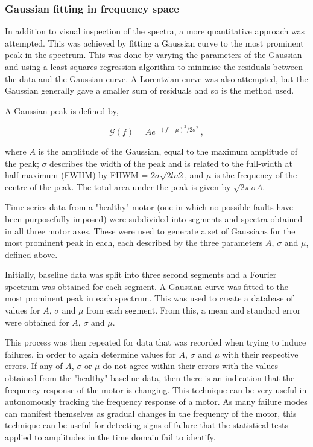 \subsubsection{Gaussian fitting in frequency space}

In addition to visual inspection of the spectra, a more quantitative approach was attempted. This was achieved by fitting a Gaussian curve to the most prominent peak in the spectrum. This was done by varying the parameters of the Gaussian and using a least-squares regression algorithm to minimise the residuals between the data and the Gaussian curve. A Lorentzian curve was also attempted, but the Gaussian generally gave a smaller sum of residuals and so is the method used. 

A Gaussian peak is defined by,

\begin{equation}
   \mathcal{G}(f) = A e^{-(f-\mu)^2/2\sigma^2}~,
    \label{eq:gaussian}
\end{equation}

where $A$ is the amplitude of the Gaussian, equal to the maximum amplitude of the peak; $\sigma$ describes the width of the peak and is related to the full-width at half-maximum (FWHM) by FHWM = $2\sigma \sqrt{2ln2}$, and $\mu$ is the frequency of the centre of the peak. The total area under the peak is given by $\sqrt{2\pi}\sigma A$.

Time series data from a "healthy" motor (one in which no possible faults have been purposefully imposed) were subdivided into segments and spectra obtained in all three motor axes. These were used to generate a set of Gaussians for the most prominent peak in each, each described by the three parameters $A$, $\sigma$ and $\mu$, defined above.

Initially, baseline data was split into three second segments and a Fourier spectrum was obtained for each segment. A Gaussian curve was fitted to the most prominent peak in each spectrum. This was used to create a database of values for $A$, $\sigma$ and $\mu$ from each segment. From this, a mean and standard error were obtained for $A$, $\sigma$ and $\mu$. 

This process was then repeated for data that was recorded when trying to induce failures, in order to again determine values for $A$, $\sigma$ and $\mu$ with their respective errors. If any of $A$, $\sigma$ or $\mu$ do not agree within their errors with the values obtained from the "healthy" baseline data, then there is an indication that the frequency response of the motor is changing. This technique can be very useful in autonomously tracking the frequency response of a motor. As many failure modes can manifest themselves as gradual changes in the frequency of the motor, this technique can be useful for detecting signs of failure that the statistical tests applied to amplitudes in the time domain fail to identify.

